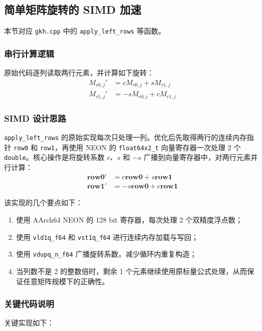\documentclass[UTF8,a4paper]{ctexart}
\begin{document}
\subsection{简单矩阵旋转的 SIMD 加速}
本节对应 \texttt{gkh.cpp} 中的 \texttt{apply\_left\_rows} 等函数。

\subsubsection{串行计算逻辑}
原始代码逐列读取两行元素，并计算如下旋转：
\[
\begin{aligned}
  M_{r0,j}' &= cM_{r0,j} + sM_{r1,j} \\
  M_{r1,j}' &= -sM_{r0,j} + cM_{r1,j}
\end{aligned}
\]

\subsubsection{SIMD 设计思路}
\texttt{apply\_left\_rows} 的原始实现每次只处理一列。优化后先取得两行的连续内存指针 \texttt{row0} 和 \texttt{row1}，再使用 NEON 的 \texttt{float64x2\_t} 向量寄存器一次处理 2 个 \texttt{double}。核心操作是将旋转系数 $c$、$s$ 和 $-s$ 广播到向量寄存器中，对两行元素并行计算：
\[
\begin{aligned}
  \mathbf{row0}' &= c\mathbf{row0} + s\mathbf{row1} \\
  \mathbf{row1}' &= -s\mathbf{row0} + c\mathbf{row1}
\end{aligned}
\]

该实现的几个要点如下：
\begin{enumerate}
  \item 使用 AArch64 NEON 的 128 bit 寄存器，每次处理 2 个双精度浮点数；
  \item 使用 \texttt{vld1q\_f64} 和 \texttt{vst1q\_f64} 进行连续内存加载与写回；
  \item 使用 \texttt{vdupq\_n\_f64} 广播旋转系数，减少循环内重复构造；
  \item 当列数不是 2 的整数倍时，剩余 1 个元素继续使用原标量公式处理，从而保证任意矩阵规模下的正确性。
\end{enumerate}

\subsubsection{关键代码说明}
关键实现如下：
\end{document}
